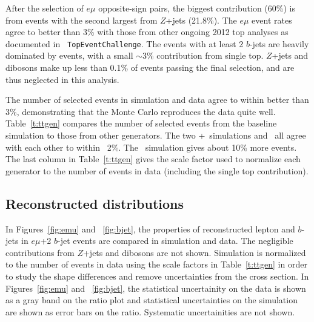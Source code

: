 After the selection of $e\mu$ opposite-sign pairs, the biggest contribution (60\%) is from \ttbar events with the second largest from $Z$+jets (21.8\%). The $e\mu$ event rates agree to  better than 3\% with those from other ongoing 2012 top analyses as documented in \texttt{ TopEventChallenge}\cite{topeventchallenge}. The events with at least 2 $b$-jets are heavily dominated by \ttbar events, with a small $\sim 3\%$ contribution from single top. $Z$+jets and dibosons make up less than 0.1\% of events passing the final selection, and are thus neglected in this analysis.


The number of selected events in simulation and data agree to within better than 3\%, demonstrating that the Monte Carlo reproduces the data quite well. Table~\ref{t:ttgen} compares the number of selected events from the baseline \ttbar simulation to those from other \ttbar generators. The two \pow+\py\ simulations and \mcnlohw\ all agree with each other to within ~2\%. The \madpy\ simulation gives about 10\% more events. The last column in Table~\ref{t:ttgen} gives the scale factor used to normalize each \ttbar generator to the number of events in data (including the single top contribution).



\subsection{Reconstructed distributions}
In Figures~\ref{fig:emu} and ~\ref{fig:bjet}, the properties of reconstructed lepton and $b$-jets in $e\mu$+2 $b$-jet events are compared in simulation and data. The negligible contributions from $Z$+jets and dibosons are not shown. Simulation is normalized to the number of events in data using the scale factors in Table~\ref{t:ttgen} in order to study the shape differences and remove uncertainties from the \ttbar cross section. In Figures~\ref{fig:emu} and ~\ref{fig:bjet}, the statistical uncertainity on the data is shown as a gray band on the ratio plot and statistical uncertainties on the simulation are shown as error bars on the ratio. Systematic uncertainities are not shown.

